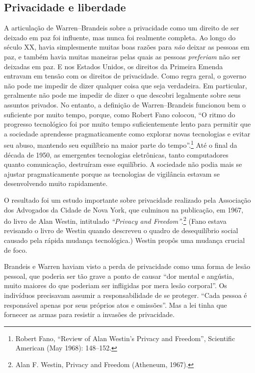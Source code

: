 \documentclass{book}
\newcommand{\ingles}[1]{\textit{#1}}
\begin{document}
\subsection{Privacidade e liberdade}
\label{cap3:quem-que-privacidade}

A articulação de Warren--Brandeis sobre a privacidade como um direito de ser
deixado em paz foi influente, mas nunca foi realmente completa. Ao longo do
século XX, havia simplesmente muitas boas razões para \emph{não} deixar as pessoas
em paz, e também havia muitas maneiras pelas quais as pessoas \emph{preferiam} não
ser deixadas em paz. E nos Estados Unidos, os direitos da Primeira Emenda
entravam em tensão com os direitos de privacidade. Como regra geral, o governo
não pode me impedir de dizer qualquer coisa que seja verdadeira. Em particular,
geralmente não pode me impedir de dizer o que descobri legalmente sobre seus
assuntos privados. No entanto, a definição de Warren--Brandeis funcionou bem
o suficiente por muito tempo, porque, como Robert Fano colocou, ``O ritmo do
progresso tecnológico foi por muito tempo suficientemente lento para permitir
que a sociedade aprendesse pragmaticamente como explorar novas tecnologias e
evitar seu abuso, mantendo seu equilíbrio na maior parte do tempo''.\footnote{Robert
Fano, ``Review of Alan Westin’s Privacy and Freedom'', Scientific American
(May 1968): 148–152.} Até o final da década de 1950, as emergentes tecnologias
eletrônicas, tanto computadores quanto comunicação, destruíram esse equilíbrio.
A sociedade não podia mais se ajustar pragmaticamente porque as tecnologias de
vigilância estavam se desenvolvendo muito rapidamente.

O resultado foi um estudo importante sobre privacidade realizado pela Associação
dos Advogados da Cidade de Nova York, que culminou na publicação, em 1967, do
livro de Alan Westin, intitulado \ingles{``Privacy and Freedom''}.\footnote{
Alan F. Westin, Privacy and Freedom (Atheneum, 1967).} (Fano estava
revisando o livro de Westin quando descreveu o quadro de desequilíbrio social
causado pela rápida mudança tecnológica.) Westin propôs uma mudança crucial de foco.

Brandeis e Warren haviam visto a perda de privacidade como uma forma de lesão
pessoal, que poderia ser tão grave a ponto de causar ``dor mental e angústia,
muito maiores do que poderiam ser infligidas por mera lesão corporal''. Os
indivíduos precisavam assumir a responsabilidade de se proteger. ``Cada pessoa
é responsável apenas por seus próprios atos e omissões''. Mas a lei tinha que
fornecer as armas para resistir a invasões de privacidade.
\end{document}
